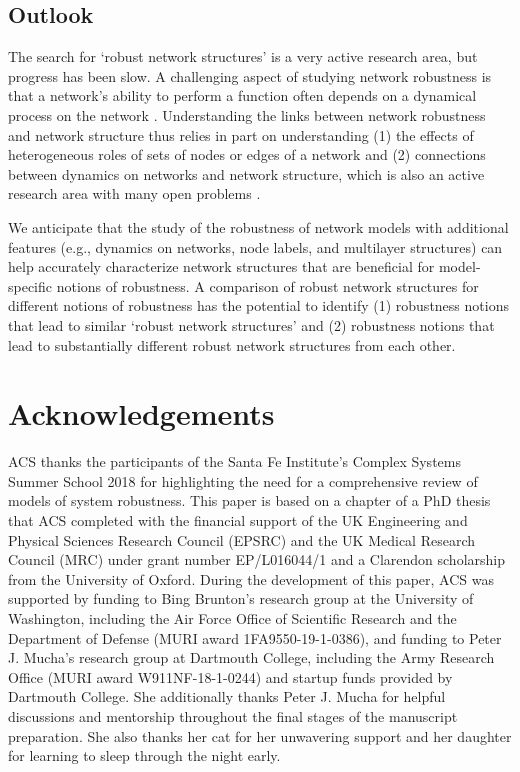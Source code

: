 \documentclass{comnet-mod}
\begin{document}
\subsection{Outlook}

The search for `robust network structures' is a very active research area, but progress has been slow. A challenging aspect of studying network robustness is that a network's ability to perform a function often depends on a dynamical process on the network \cite{Dipple2001, Motter2002, Aldana2003, Demetrius2005, Gorban2007, Kwon2008, Simonsen2008, Tanaka2012, Goles2013, He2013}. Understanding the links between network robustness and network structure thus relies in part on understanding (1) the effects of heterogeneous roles of sets of nodes or edges of a network and (2) connections between dynamics on networks and network structure, which is also an active research area with many open problems \cite{Keeling2005, Newman2006, Pascual2006, Bascompte2010, Boccaletti2014, Porter2016, Nishikawa2017, Schwarze2020}.

We anticipate that the study of the robustness of network models with additional features (e.g., dynamics on networks, node labels, and multilayer structures) can help accurately characterize network structures that are beneficial for model-specific notions of robustness. A comparison of robust network structures for different notions of robustness has the potential to identify (1) robustness notions that lead to similar `robust network structures' and (2) robustness notions that lead to substantially different robust network structures from each other.


\section*{Acknowledgements}

ACS thanks the participants of the Santa Fe Institute's Complex Systems Summer School 2018 for highlighting the need for a comprehensive review of models of system robustness. This paper is based on a chapter of a PhD thesis \cite{Schwarze2019a} that ACS completed with the financial support of the UK Engineering and Physical Sciences Research Council (EPSRC) and the UK Medical Research Council (MRC) under grant number EP/L016044/1 and a Clarendon scholarship from the University of Oxford.
During the development of this paper, ACS was supported by funding to Bing Brunton's research group at the University of Washington, including the Air Force Office of Scientific Research and the Department of Defense (MURI award 1FA9550-19-1-0386), and funding to Peter J. Mucha's research group at Dartmouth College, including the Army Research Office (MURI award W911NF-18-1-0244) and startup funds provided by Dartmouth College. She additionally thanks Peter J. Mucha for helpful discussions and mentorship throughout the final stages of the manuscript preparation.  
She also thanks her cat for her unwavering support and her daughter for learning to sleep through the night early.
\end{document}
